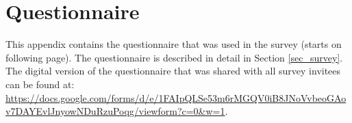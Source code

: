
\chapter{Questionnaire} %

\label{Questionnaire} %


This appendix contains the questionnaire that was used in the survey (starts on following page).
The questionnaire is described in detail in Section \ref{sec_survey}.
The digital version of the questionnaire that was shared with all survey invitees can be found at: \url{https://docs.google.com/forms/d/e/1FAIpQLSe53m6rMGQV0iB8JNoVvbeoGAov7DAYEvlJnyowNDuRzuPoqg/viewform?c=0&w=1}.

